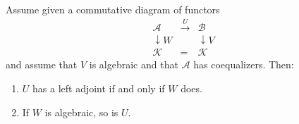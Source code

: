 Assume given a commutative diagram of functors
\[
\begin{array}{ccc}
\mathcal{A} & \xrightarrow{U} & \mathcal{B} \\
\downarrow{W} & & \downarrow{V} \\
\mathcal{K} & = & \mathcal{K}
\end{array}
\]
and assume that $V$ is algebraic and that $\mathcal{A}$ has coequalizers. Then:
\begin{enumerate}
\item $U$ has a left adjoint if and only if $W$ does.
\item If $W$ is algebraic, so is $U$.
\end{enumerate}
